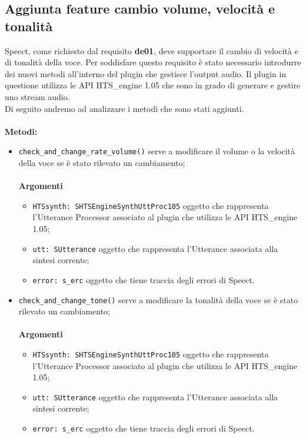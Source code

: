 \subsection{Aggiunta feature cambio volume, velocità e tonalità}
Speect, come richiesto dal requisito \textbf{de01}, deve supportare il cambio di velocità e di tonalità della voce. 
Per soddisfare questo requisito è stato necessario introdurre dei nuovi metodi all'interno del plugin che gestisce l'output audio.
Il plugin in questione utilizza le API HTS\_engine 1.05 che sono in grado di generare e gestire uno stream audio.\\
Di seguito andremo ad analizzare i metodi che sono stati aggiunti.\\\\
\textbf{Metodi:}
\begin{itemize}
	\item \texttt{check\_and\_change\_rate\_volume()} serve a modificare il volume o la velocità della voce se è stato rilevato un cambiamento;\\\\
	\textbf{Argomenti}
	\begin{itemize}
		\item \texttt{HTSsynth: SHTSEngineSynthUttProc105} oggetto che rappresenta l'Utterance Processor associato al plugin che utilizza le API HTS\_engine 1.05;
		\item \texttt{utt: SUtterance} oggetto che rappresenta l'Utterance associata alla sintesi corrente;
		\item \texttt{error: s\_erc} oggetto che tiene traccia degli errori di Speect.
	\end{itemize}
	\item \texttt{check\_and\_change\_tone()} serve a modificare la tonalità della voce se è stato rilevato un cambiamento;\\\\
	\textbf{Argomenti}
	\begin{itemize}
		\item \texttt{HTSsynth: SHTSEngineSynthUttProc105} oggetto che rappresenta l'Utterance Processor associato al plugin che utilizza le API HTS\_engine 1.05;
		\item \texttt{utt: SUtterance} oggetto che rappresenta l'Utterance associata alla sintesi corrente;
		\item \texttt{error: s\_erc} oggetto che tiene traccia degli errori di Speect.
	\end{itemize}
\end{itemize}

